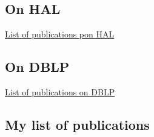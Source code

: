 \documentclass[ 12pt]{article}
\begin{document}
\subsection{On HAL}


 \href{https://haltools.inria.fr/Public/afficheRequetePubli.php?auteur_exp=dominique%2Cmery&annee_publideb=1980&annee_publifin=2024&CB_auteur=oui&CB_titre=oui&CB_article=oui&langue=Anglais&tri_exp=annee_publi&tri_exp2=typdoc&tri_exp3=date_publi&ordre_aff=TA&Fen=Aff&css=../css/VisuRubriqueEncadre.css}{List
   of publications pon HAL}

\subsection{On DBLP }
  \href{https://dblp.org/pid/51/6932.html}{List
   of publications on  DBLP }

 

 \subsection{My list of publications}
%
%



\end{document}
